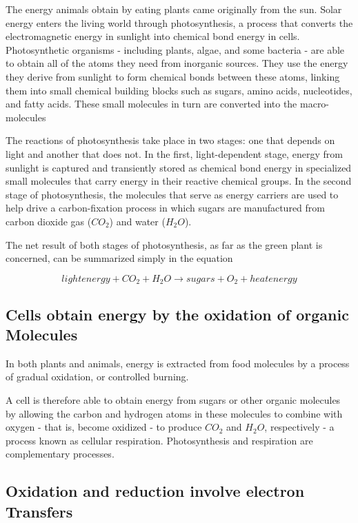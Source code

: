 The energy animals obtain by eating plants came originally from the sun.
Solar energy enters the living world through photosynthesis, a process
that converts the electromagnetic energy in sunlight into chemical bond
energy in cells. Photosynthetic organisms - including plants, algae, and
some bacteria - are able to obtain all of the atoms they need from inorganic sources.
They use the energy they derive from sunlight
to form chemical bonds between these atoms, linking them into small
chemical building blocks such as sugars, amino acids, nucleotides, and
fatty acids. These small molecules in turn are converted into the macro-molecules

The reactions of photosynthesis take place in two stages: one that
depends on light and another that does not. In the first, light-dependent
stage, energy from sunlight is captured and transiently stored
as chemical bond energy in specialized small molecules that carry energy
in their reactive chemical groups.
In the second stage of photosynthesis, the molecules that serve as energy
carriers are used to help drive a carbon-fixation process in which sugars
are manufactured from carbon dioxide gas ($CO_{2}$) and water ($H_{2}O$).

The net result of both stages of photosynthesis, as far as the green plant
is concerned, can be summarized simply in the equation

\begin{equation}
light energy + CO_{2} + H_{2}O \rightarrow sugars + O_{2} + heat energy
\end{equation}

\subsection{Cells obtain energy by the oxidation of organic Molecules}

In both plants and
animals, energy is extracted from food molecules by a process of gradual
oxidation, or controlled burning.

A cell is therefore able to obtain energy from sugars or other
organic molecules by allowing the carbon and hydrogen atoms in these
molecules to combine with oxygen - that is, become oxidized - to produce
$CO_{2}$ and $H_{2}O$, respectively - a process known as cellular respiration.
Photosynthesis and respiration are complementary processes.

\subsection{Oxidation and reduction involve electron Transfers}

